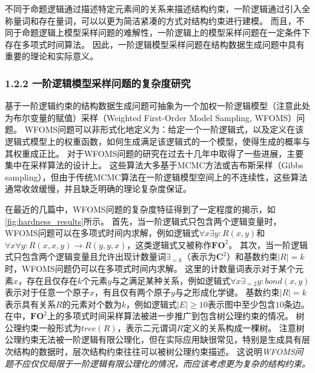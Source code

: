 \documentclass[12pt,UTF8,AutoFakeBold=3,a4paper]{ctexart} %
\newcommand{\fotwo}{\ensuremath{\mathbf{FO}^2}}
\newcommand{\ctwo}{\ensuremath{\mathbf{C}^2}}
\begin{document}
不同于命题逻辑通过描述特定元素间的关系来描述结构约束，一阶逻辑通过引入全称量词和存在量词，可以以更为简洁紧凑的方式对结构约束进行建模。
而且，不同于命题逻辑上模型采样问题的难解性，一阶逻辑上的模型采样问题在一定条件下存在多项式时间算法。
因此，一阶逻辑模型采样问题在结构数据生成问题中具有重要的理论和实际意义。

\subsubsection{1.2.2 一阶逻辑模型采样问题的复杂度研究}

基于一阶逻辑约束的结构数据生成问题可抽象为一个加权一阶逻辑模型（注意此处为布尔变量的赋值）采样（Weighted First-Order Model Sampling, WFOMS）问题。
WFOMS问题可以非形式化地定义为：给定一个一阶逻辑式，以及定义在该逻辑式模型上的权重函数，如何生成满足该逻辑式的一个模型，使得生成的概率与其权重成正比。
对于WFOMS问题的研究在过去十几年中取得了一些进展，主要集中在采样算法的设计上。
这些算法大多基于MCMC方法或吉布斯采样（Gibbs sampling），但由于传统MCMC算法在一阶逻辑模型空间上的不连续性，这些算法通常收敛缓慢，并且缺乏明确的理论复杂度保证。

在最近的几篇中，WFOMS问题的复杂度特征得到了一定程度的揭示，如\cref{fig:hardness_results}所示。
首先，当一阶逻辑式只包含两个逻辑变量时，WFOMS问题可以在多项式时间内求解，例如逻辑式$\forall x\exists y: R(x,y)$和$\forall x\forall y: R(x,x,y) \to R(y,y,x)$，这类逻辑式又被称作\fotwo{}。
其次，当一阶逻辑式只包含两个逻辑变量且允许出现计数量词$\exists_{=k}$（表示为\ctwo{}）和基数约束$|R| = k$时，WFOMS问题仍可以在多项式时间内求解。
这里的计数量词表示对于某个元素$x$，存在且仅存在$k$个元素$y$与之满足某种关系，例如逻辑式$\forall x\exists_{=2} y: bond(x,y)$表示对于任意一个原子$x$，有且仅有两个原子$y$与之形成化学键。
基数约束$|R| = k$表示具有关系$R$的元素对个数为$k$，例如逻辑式$|E| \ge 10$表示图中至少包含$10$条边。
在中，\fotwo{}上的多项式时间采样算法被进一步推广到包含树公理约束的情况。
树公理约束一般形式为$tree(R)$，表示二元谓词$R$定义的关系构成一棵树。
注意树公理约束无法被一阶逻辑有限公理化，但在实际应用缺很常见，特别是生成具有层次结构的数据时，层次结构约束往往可以被树公理约束描述。
这说明\emph{WFOMS问题不应仅仅局限于一阶逻辑有限公理化的情况，而应该考虑更为复杂的结构约束。}
\end{document}
